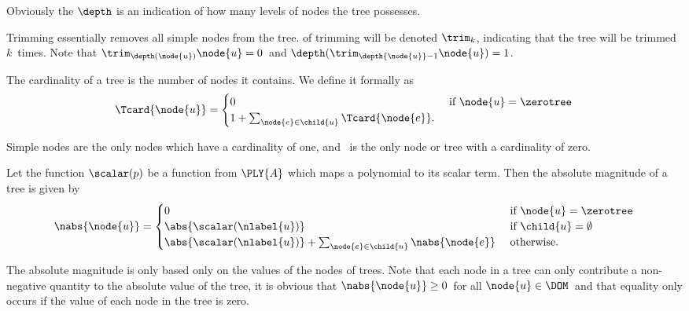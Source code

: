 Obviously the $\depth$ is an indication of how many levels of nodes
the tree possesses.

Trimming essentially removes all simple nodes from the tree.
of trimming will be denoted $\trim_{k}$, indicating that the tree
 will be trimmed $k$\ times. Note that
$\trim_{\depth(\node{u})}{\node{u}} = 0$\ and
$\depth(\trim_{\depth{\node{u}}-1}{\node{u}}) = 1$.

\begin{definition}
  The cardinality of a tree is the number of nodes it contains. We define it formally as
  \begin{align*}
    \Tcard{\node{u}} = \begin{cases}
      0 & \text{ if } \node{u} = \zerotree\\
      1 + \sum_{\node{e}\in\child{u}} \Tcard{\node{e}}.
    \end{cases}
  \end{align*}

  Simple nodes are the only nodes which have a cardinality of one, and \tzerotree\ is the only node or tree with a
  cardinality of zero.
\end{definition}

\begin{definition}\label{absolute-mag}
  Let the function $\scalar(p)$ be a function from $\PLY{A}$ which
  maps a polynomial to its scalar term. Then the absolute magnitude of
  a tree is given by
  \begin{align*}
    \nabs{\node{u}} = \begin{cases}
      0 & \text{ if } \node{u} = \zerotree \\
      \abs{\scalar(\nlabel{u})} & \text{ if }\child{u} = \emptyset \\
      \abs{\scalar(\nlabel{u})} + \sum_{\node{e}\in\child{u}}\nabs{\node{e}} & \text{ otherwise.}
    \end{cases}
  \end{align*}
\end{definition}
The absolute magnitude is only based only on the values of the
nodes of trees. %
Note that each node in a tree can only contribute a non-negative
quantity to the absolute value of the tree, it is obvious that
$\nabs{\node{u}} \geq 0$\ for all $\node{u} \in \DOM$\ and that
equality only occurs if the value of each node in the tree 
is zero.

